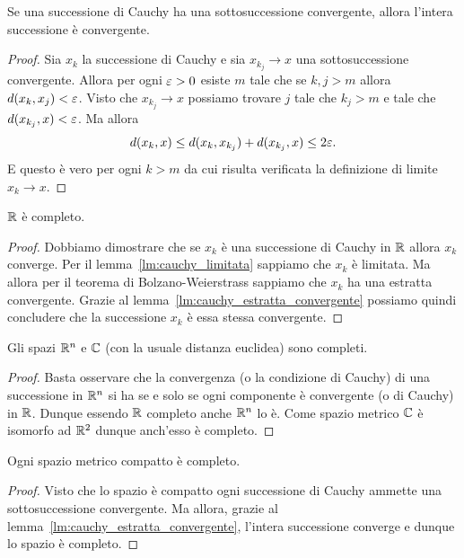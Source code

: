 \begin{lemma}
\label{lm:cauchy_estratta_convergente}
Se una successione di Cauchy ha una sottosuccessione convergente, allora l'intera successione è convergente.
\end{lemma}
%
\begin{proof}
Sia $x_k$ la successione di Cauchy e sia $x_{k_j}\to x$ una  sottosuccessione convergente.
Allora per ogni $\varepsilon>0$
esiste $m$ tale che se $k,j>m$ allora $d(x_k ,x_j) < \varepsilon$.
Visto che $x_{k_j} \to x$ possiamo trovare $j$ tale che $k_j > m$ e tale che $d(x_{k_j},x) < \varepsilon$. Ma allora
\[
  d(x_k,x) \le d(x_k, x_{k_j}) + d(x_{k_j},x)
   \le 2 \varepsilon.
\]
E questo è vero per ogni $k > m$ da cui risulta verificata la definizione di limite $x_k \to x$.
\end{proof}

\begin{theorem}[completezza di $\RR$]
\mymark{***}%
%
%
\label{th:R-completo}%
$\RR$ è completo.
\end{theorem}
%
\begin{proof}
\mymark{***}
Dobbiamo dimostrare che se $x_k$ è una successione di Cauchy in $\RR$ allora $x_k$ converge.
Per il lemma~\ref{lm:cauchy_limitata} sappiamo che $x_k$ è limitata.
Ma allora per il teorema di Bolzano-Weierstrass sappiamo che $x_k$ ha
una estratta convergente.
Grazie al lemma~\ref{lm:cauchy_estratta_convergente} possiamo quindi concludere
che la successione $x_k$ è essa stessa convergente.
\end{proof}

\begin{corollary}[completezza di $\RR^n$ e $\CC$]
Gli spazi $\RR^n$ e $\CC$ (con la usuale distanza euclidea)
sono completi.
\end{corollary}
%
\begin{proof}
Basta osservare che la convergenza (o la condizione di Cauchy) di una successione in $\RR^n$ si ha se e solo se ogni componente è convergente (o di Cauchy) in $\RR$. Dunque essendo $\RR$ completo anche $\RR^n$ lo è. Come spazio metrico $\CC$ è isomorfo ad $\mathbb R^2$ dunque anch'esso è completo.
\end{proof}

\begin{theorem}
Ogni spazio metrico compatto è completo.
\end{theorem}
%
\begin{proof}
Visto che lo spazio è compatto ogni successione di Cauchy
ammette una sottosuccessione convergente.
Ma allora, grazie al lemma~\ref{lm:cauchy_estratta_convergente},
l'intera successione converge e dunque lo spazio è completo.
\end{proof}

